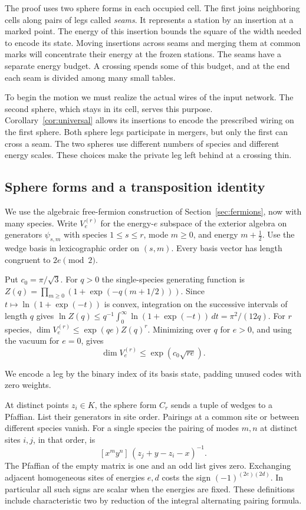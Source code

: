 The proof uses two sphere forms in each occupied cell.
The first joins neighboring cells along pairs of legs called \emph{seams}.
It represents a station by an insertion at a marked point. The energy
of this insertion bounds the square of the width needed to encode its
state. Moving insertions across seams and merging them at common marks
will concentrate their energy at the frozen stations. The seams have
a separate energy budget. A crossing spends some of this budget, and
at the end each seam is divided among many small tables.

To begin the motion we must realize the actual wires of the input
network. The second sphere, which stays in its cell, serves this purpose.
Corollary~\ref{cor:universal} allows its insertions to encode the
prescribed wiring on the first sphere. Both sphere legs participate in
mergers, but only the first can cross a seam. The two spheres use
different numbers of species and different energy scales. These choices
make the private leg left behind at a crossing thin.

\subsection{Sphere forms and a transposition identity}\label{subsec:seam}

We use the algebraic free-fermion construction of Section~\ref{sec:fermions}, now with many species.
Write \(V^{(r)}_e\) for the energy-\(e\) subspace of the exterior algebra
on generators \(\psi_{s,m}\) with species \(1\le s\le r\), mode \(m\ge0\),
and energy \(m+\tfrac12\). Use the wedge basis in lexicographic order
on \((s,m)\). Every basis vector has length congruent to \(2e\pmod2\). 

Put \(c_0=\pi/\sqrt3\). For \(q>0\) the single-species generating
function is \(Z(q)=\prod_{m\ge0}(1+\exp(-q(m+1/2)))\).
Since \(t\mapsto\ln(1+\exp(-t))\) is convex, integration on the
successive intervals of length \(q\) gives
\(\ln Z(q)\le q^{-1}\int_0^\infty\ln(1+\exp(-t))\,dt=\pi^2/(12q)\).
For \(r\) species, \(\dim V^{(r)}_e\le\exp(qe)Z(q)^r\).
Minimizing over \(q\) for \(e>0\), and using the vacuum for \(e=0\), gives
\begin{equation}\label{eq:local-width}
      \dim V^{(r)}_e\le \exp(c_0\sqrt{re}).
\end{equation}

We encode a leg by the binary index of its basis state, padding unused
codes with zero weights.

At distinct points \(z_i\in K\), the sphere form \(C_r\) sends a tuple
of wedges to a Pfaffian. List their generators in site order. Pairings
at a common site or between different species vanish. For a single
species the pairing of modes \(m,n\) at distinct sites \(i,j\), in that
order, is
\[
 [x^m y^n]\,(z_j+y-z_i-x)^{-1}.
\]
The Pfaffian of the empty matrix is one and an odd list gives zero.
Exchanging adjacent homogeneous sites of energies \(e,d\) costs the sign
\((-1)^{(2e)(2d)}\). In particular all such signs are scalar when the energies
are fixed. These definitions include characteristic two by reduction of
the integral alternating pairing formula.

